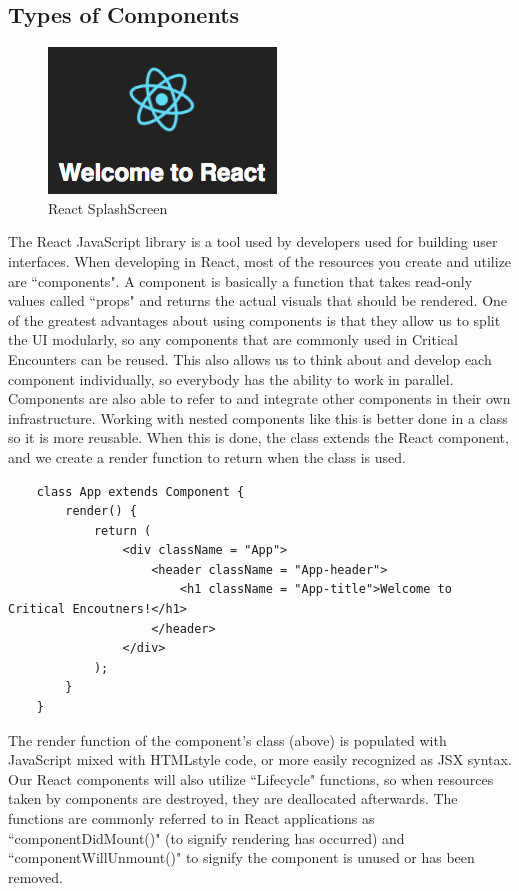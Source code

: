 \documentclass[12pt,a4paper]{report}
\begin{document}
	\subsection{Types of Components}
	\begin{figure}[H]
		\centering
		\includegraphics[scale=.7]{welcometoreact}
		\caption{React SplashScreen}
		\label{fig: React SplashScreen}
	\end{figure}
	The React JavaScript library is a tool used by developers used for building user interfaces. When developing in React, most of the resources you create and utilize are ``components". A component is basically a function that takes read-only values called ``props" and returns the actual visuals that should be rendered. One of the greatest advantages about using components is that they allow us to split the UI modularly, so any components that are commonly used in Critical Encounters can be reused. This also allows us to think about and develop each component individually, so everybody has the ability to work in parallel. Components are also able to refer to and integrate other components in their own infrastructure. Working with nested components like this is better done in a class so it is more reusable. When this is done, the class extends the React component, and we create a render function to return when the class is used.
	\bigskip
	\begin{lstlisting}
	class App extends Component {
		render() {
			return (
				<div className = "App">
					<header className = "App-header">
						<h1 className = "App-title">Welcome to Critical Encoutners!</h1>
					</header>
				</div>
			);
		}
	}
	\end{lstlisting}
	The render function of the component's class (above) is populated with JavaScript mixed with HTMLstyle code, or more easily recognized as JSX syntax. Our React components will also utilize ``Lifecycle" functions, so when resources taken by components are destroyed, they are deallocated afterwards. The functions are commonly referred to in React applications as ``componentDidMount()" (to signify rendering has occurred) and ``componentWillUnmount()" to signify the component is unused or has been removed.
\end{document}
